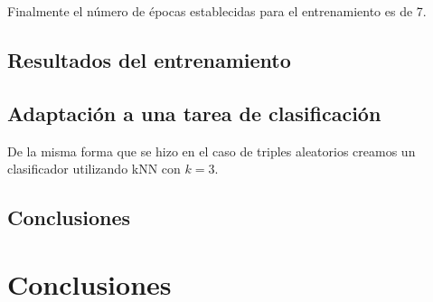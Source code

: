 \documentclass[11pt]{article}
\begin{document}
Finalmente el número de épocas establecidas para el entrenamiento es de 7.

\subsection{Resultados del entrenamiento}

\subsection{Adaptación a una tarea de clasificación}

De la misma forma que se hizo en el caso de triples aleatorios creamos un clasificador utilizando kNN con $k = 3$.

\subsection{Conclusiones}


\pagebreak

\section{Conclusiones}

\pagebreak



\end{document}

